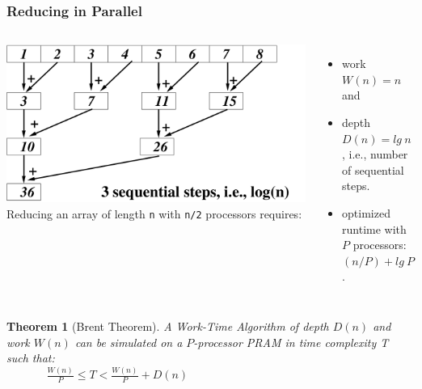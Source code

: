 \documentclass{beamer}
\renewcommand{\emph}[1]{\textcolor{structure}{#1}}
\newcommand{\emp}[1]{\textcolor{DikuRed}{ #1}}
\newtheorem{mytheo}{Theorem}
\begin{document}
\begin{frame}
  \frametitle{Reducing in Parallel}

\begin{columns}
        \includegraphics[height=22ex]{Figures/L2/ReduceEg.pdf} 
Reducing an array of length {\tt n} with {\tt  n/2} processors requires:
\begin{itemize}
    \item work $W(n) = n$ and 
    \item depth $D(n) = lg \ n$, i.e., number of sequential steps.
    \item optimized runtime with $P$ processors: \emph{$(n/P) + lg \ P$.}
\end  {itemize}
\end{columns}

\begin{mytheo}[Brent Theorem]\label{BrentTh}
A Work-Time Algorithm of depth $D(n)$ and work $W(n)$ can be
simulated on a $P$-processor PRAM in time complexity T such that:\\\bigskip
\emp{$\ \ \ \ \ \ \ \ \ \ \ \ \ \ \ \ \frac{W(n)}{P} \leq T < \frac{W(n)}{P} + D(n)$}
\end{mytheo}

\end{frame}
\end{document}
